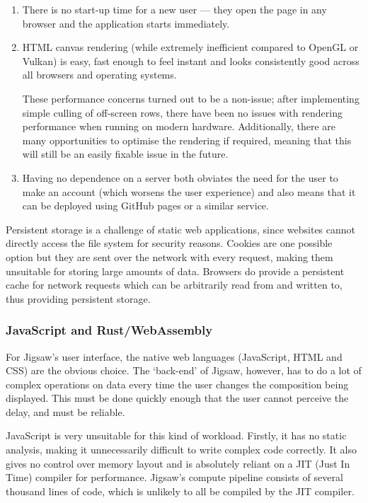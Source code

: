 \documentclass[12pt]{article}
\begin{document}
\begin{enumerate}
    \item There is no start-up time for a new user --- they open the page in any browser and the
        application starts immediately.
    \item HTML canvas rendering (while extremely inefficient compared to OpenGL or Vulkan) is easy,
        fast enough to feel instant and looks consistently good across all browsers and operating
        systems.

        These performance concerns turned out to be a non-issue; after implementing simple culling
        of off-screen rows, there have been no issues with rendering performance when running on
        modern hardware.  Additionally, there are many opportunities to optimise the rendering if
        required, meaning that this will still be an easily fixable issue in the future.
    \item Having no dependence on a server both obviates the need for the user to make an account
        (which worsens the user experience) and also means that it can be deployed using GitHub
        pages or a similar service.
\end{enumerate}

Persistent storage is a challenge of static web applications, since websites cannot directly access
the file system for security reasons.  Cookies are one possible option but they are sent over the
network with every request, making them unsuitable for storing large amounts of data.  Browsers do
provide a persistent cache for network requests which can be arbitrarily read from and written to,
thus providing persistent storage.

\subsubsection{JavaScript and Rust/WebAssembly}

For Jigsaw's user interface, the native web languages (JavaScript, HTML and CSS) are the obvious
choice.  The `back-end' of Jigsaw, however, has to do a lot of complex operations on data every time
the user changes the composition being displayed.  This must be done quickly enough that the user
cannot perceive the delay, and must be reliable.

JavaScript is very unsuitable for this kind of workload.  Firstly, it has no static analysis, making
it unnecessarily difficult to write complex code correctly.  It also gives no control over memory
layout and is absolutely reliant on a JIT (Just In Time) compiler for performance.  Jigsaw's compute
pipeline consists of several thousand lines of code, which is unlikely to all be compiled by the JIT
compiler.
\end{document}
